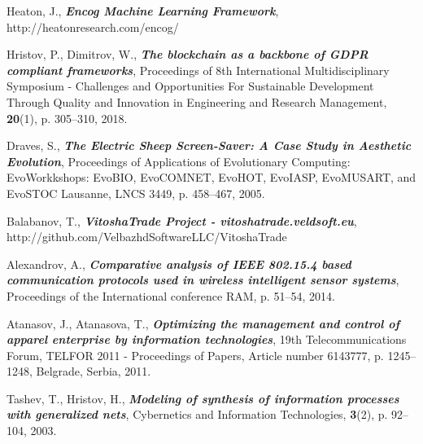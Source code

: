 \documentclass[runningheads]{llncs}
\begin{document}
\begin{thebibliography}{8}
 Heaton, J., \textbf{\textit{Encog Machine Learning Framework}}, http://heatonresearch.com/encog/

 Hristov, P., Dimitrov, W., \textbf{\textit{The blockchain as a backbone of GDPR compliant frameworks}}, Proceedings of 8th International Multidisciplinary Symposium - Challenges and Opportunities For Sustainable Development Through Quality and Innovation in Engineering and Research Management, \textbf{20}(1), p. 305--310, 2018.

 Draves, S., \textbf{\textit{The Electric Sheep Screen-Saver: A Case Study in Aesthetic Evolution}}, Proceedings of Applications of Evolutionary Computing: EvoWorkkshops: EvoBIO, EvoCOMNET, EvoHOT, EvoIASP, EvoMUSART, and EvoSTOC Lausanne, LNCS 3449, p. 458--467, 2005.

 Balabanov, T., \textbf{\textit{VitoshaTrade Project - vitoshatrade.veldsoft.eu}}, http://github.com/VelbazhdSoftwareLLC/VitoshaTrade

 Alexandrov, A., \textbf{\textit{Comparative analysis of IEEE 802.15.4 based communication protocols used in wireless intelligent sensor systems}}, Proceedings of the International conference RAM, p. 51--54, 2014.

 Atanasov, J., Atanasova, T., \textbf{\textit{Optimizing the management and control of apparel enterprise by information technologies}}, 19th Telecommunications Forum, TELFOR 2011 - Proceedings of Papers, Article number 6143777, p. 1245--1248, Belgrade, Serbia, 2011.

 Tashev, T., Hristov, H., \textbf{\textit{Modeling of synthesis of information processes with generalized nets}}, Cybernetics and Information Technologies, \textbf{3}(2), p. 92--104, 2003.
\end{thebibliography}
\end{document}
